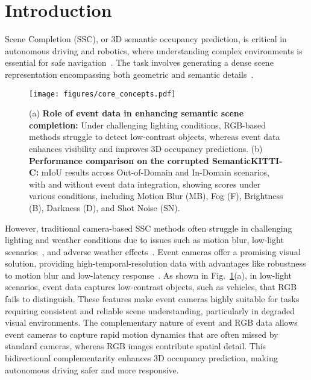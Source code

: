 \section{Introduction}
%
 Scene Completion (SSC), or 3D semantic occupancy prediction, is critical in autonomous driving and robotics, where understanding complex environments is essential for safe navigation~\cite{zhang2024vision3D}. 
The task involves generating a dense scene representation encompassing both geometric and semantic details~\cite{xu2023survey, xu2025survey}.

\begin{figure}[t]
\centering
\texttt{[image: figures/core\_concepts.pdf]}
%
\caption{(a) \textbf{Role of event data in enhancing semantic scene completion:} Under challenging lighting conditions, RGB-based methods struggle to detect low-contrast objects, whereas event data enhances visibility and improves 3D occupancy predictions. 
(b) \textbf{Performance comparison on the corrupted SemanticKITTI-C:} mIoU results across Out-of-Domain and In-Domain scenarios, with and without event data integration, showing scores under various conditions, including Motion Blur (MB), Fog (F), Brightness (B), Darkness (D), and Shot Noise (SN).}
\label{fig:core_concepts}
\end{figure}

%

However, traditional camera-based SSC methods often struggle in challenging lighting and weather conditions due to issues such as motion blur, low-light scenarios~\cite{Gehrig2024LowLatency}, and adverse weather effects~\cite{Kong2023Robo3D}. Event cameras offer a promising visual solution, providing high-temporal-resolution data with advantages like robustness to motion blur and low-latency response~\cite{gallego2020eventbased}. As shown in Fig.~\ref{fig:core_concepts}(a), in low-light scenarios, event data captures low-contrast objects, such as vehicles, that RGB fails to distinguish. These features make event cameras highly suitable for tasks requiring consistent and reliable scene understanding, particularly in degraded visual environments. 
%
The complementary nature of event and RGB data allows event cameras to capture rapid motion dynamics that are often missed by standard cameras, whereas RGB images contribute spatial detail. This bidirectional complementarity enhances 3D occupancy prediction, making autonomous driving safer and more responsive.



